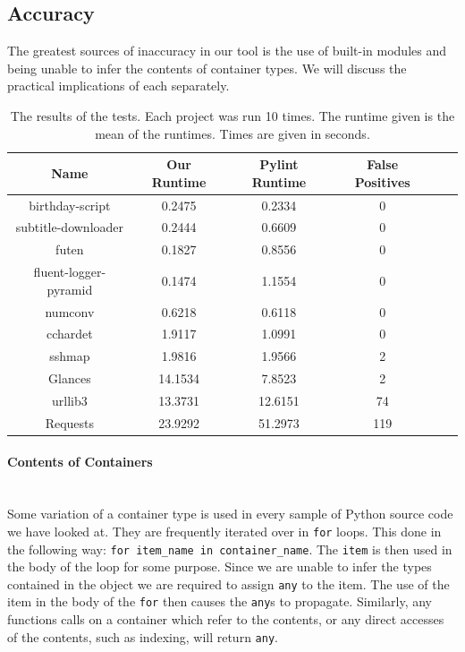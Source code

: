 \documentclass[12pt, titlepage]{article}
\begin{document}
\subsection{Accuracy}
The greatest sources of inaccuracy in our tool is the use of built-in modules and being unable to infer the contents of container types. We will discuss the practical implications of each separately.

    	\begin{table}
	\centering
    \begin{tabular}{ | c | c | c | c | c | c |}
    \hline
    \textbf{Name} & \textbf{Our Runtime} & \textbf{Pylint Runtime} & \textbf{False Positives} \\ \hline
    birthday-script & 0.2475 & 0.2334 & 0 \\ \hline
    subtitle-downloader & 0.2444 & 0.6609 & 0 \\ \hline
    futen & 0.1827 & 0.8556 & 0 \\ \hline
    fluent-logger-pyramid & 0.1474 & 1.1554 & 0 \\ \hline
    numconv & 0.6218 & 0.6118 & 0 \\ \hline
    cchardet &  1.9117 & 1.0991 & 0  \\ \hline
    sshmap & 1.9816 & 1.9566 & 2 \\ \hline
    Glances & 14.1534  & 7.8523 & 2 \\ \hline
    urllib3 & 13.3731  & 12.6151 & 74 \\ \hline
    Requests & 23.9292  & 51.2973 & 119 \\ \hline
    \end{tabular}
    \caption{The results of the tests. Each project was run 10 times. The runtime given is the mean of the runtimes. Times are given in seconds.}
	\label{table:toolResults}
    \end{table}

\paragraph*{Contents of Containers}\mbox{}\\
Some variation of a container type is used in every sample of Python source code we have looked at. They are frequently iterated over in \texttt{for} loops. This done in the following way: \texttt{for item\_name in container\_name}. The \texttt{item} is then used in the body of the loop for some purpose. Since we are unable to infer the types contained in the object we are required to assign \texttt{any} to the item. The use of the item in the body of the \texttt{for} then causes the \texttt{any}s to propagate. Similarly, any functions calls on a container which refer to the contents, or any direct accesses of the contents, such as indexing, will return \texttt{any}.
\end{document}

